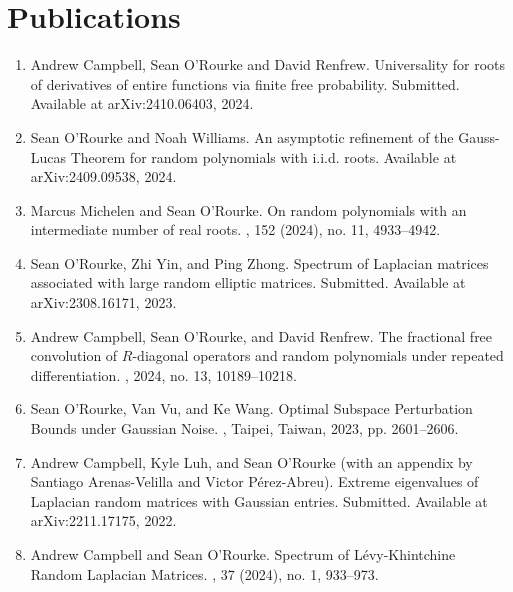 \documentclass[letterpaper]{article}
\begin{document}
\section*{Publications}
\begin{enumerate}
	\item Andrew Campbell, Sean O'Rourke and David Renfrew. 
	\newblock Universality for roots of derivatives of entire functions via finite free probability. 
	\newblock Submitted.  Available at arXiv:2410.06403, 2024. 

	\item Sean O'Rourke and Noah Williams. 
	\newblock An asymptotic refinement of the Gauss-Lucas Theorem for random polynomials with i.i.d. roots. 
	\newblock Available at arXiv:2409.09538, 2024. 

	\item Marcus Michelen and Sean O'Rourke. 
	\newblock On random polynomials with an intermediate number of real roots. 
	, 152 (2024), no. 11, 4933--4942.
	
	\item Sean O'Rourke, Zhi Yin, and Ping Zhong. 
	\newblock Spectrum of Laplacian matrices associated with large random elliptic matrices.
	\newblock Submitted.  Available at arXiv:2308.16171, 2023. 

	\item Andrew Campbell, Sean O'Rourke, and David Renfrew. 
	\newblock The fractional free convolution of $R$-diagonal operators and random polynomials under repeated differentiation. 
	,  2024, no. 13, 10189--10218. 
	
	\item Sean O'Rourke, Van Vu, and Ke Wang. 
	\newblock Optimal Subspace Perturbation Bounds under Gaussian Noise. 
	, Taipei, Taiwan, 2023, pp. 2601--2606. 

	\item Andrew Campbell, Kyle Luh, and Sean O'Rourke (with an appendix by Santiago Arenas-Velilla and Victor P\'{e}rez-Abreu). 
	\newblock Extreme eigenvalues of Laplacian random matrices with Gaussian entries.  
	\newblock Submitted.  Available at arXiv:2211.17175, 2022.  

	\item Andrew Campbell and Sean O'Rourke. 
	\newblock Spectrum of L\'{e}vy-Khintchine Random Laplacian Matrices. 
	,  37 (2024), no. 1, 933--973.  


\end{enumerate}
\end{document}
